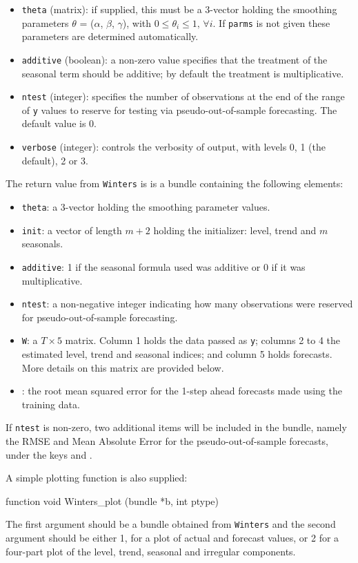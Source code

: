 \documentclass{article}
\begin{document}
\begin{itemize}
\item \texttt{theta} (matrix): if supplied, this must be a 3-vector
  holding the smoothing parameters $\theta$ = ($\alpha$, $\beta$,
  $\gamma$), with $0 \le \theta_i \le 1,\, \forall i$.  If
  \texttt{parms} is not given these parameters are determined
  automatically.
\item \texttt{additive} (boolean): a non-zero value specifies that the
  treatment of the seasonal term should be additive; by default
  the treatment is multiplicative.
\item \texttt{ntest} (integer): specifies the number of
  observations at the end of the range of \texttt{y} values to reserve
  for testing via pseudo-out-of-sample forecasting. The default value
  is 0.
\item \texttt{verbose} (integer): controls the verbosity of output, with
  levels 0, 1 (the default), 2 or 3.
\end{itemize}

The return value from \texttt{Winters} is is a bundle containing the
following elements:
\begin{itemize}
\item \texttt{theta}: a 3-vector holding the smoothing parameter
  values.
\item \texttt{init}: a vector of length $m+2$ holding the initializer:
  level, trend and $m$ seasonals.
\item \texttt{additive}: 1 if the seasonal formula used was additive or
  0 if it was multiplicative.
\item \texttt{ntest}: a non-negative integer indicating how many
  observations were reserved for pseudo-out-of-sample forecasting.
\item \texttt{W}: a $T \times 5$ matrix.  Column 1 holds the data
  passed as \texttt{y}; columns 2 to 4 the estimated level, trend and
  seasonal indices; and column 5 holds forecasts. More details on this
  matrix are provided below.
\item {}: the root mean squared error for the 1-step
  ahead forecasts made using the training data.
\end{itemize}
If \texttt{ntest} is non-zero, two additional items will be included
in the bundle, namely the RMSE and Mean Absolute Error for the
pseudo-out-of-sample forecasts, under the keys  and
.

A simple plotting function is also supplied:
\begin{nscode}
function void Winters_plot (bundle *b, int ptype)
\end{nscode}
The first argument should be a bundle obtained from \texttt{Winters}
and the second argument should be either 1, for a plot of actual and
forecast values, or 2 for a four-part plot of the level, trend,
seasonal and irregular components.
\end{document}
